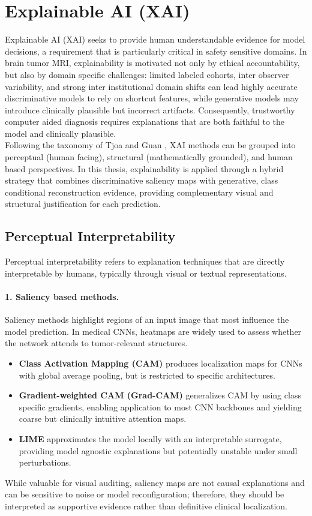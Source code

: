 \section{Explainable AI (XAI)}

Explainable AI (XAI) seeks to provide human understandable evidence for model decisions, a requirement that is particularly critical in safety sensitive domains. In brain tumor MRI, explainability is motivated not only by ethical accountability, but also by domain specific challenges: limited labeled cohorts, inter observer variability, and strong inter institutional domain shifts can lead highly accurate discriminative models to rely on shortcut features, while generative models may introduce clinically plausible but incorrect artifacts. Consequently, trustworthy computer aided diagnosis requires explanations that are both faithful to the model and clinically plausible.\\

Following the taxonomy of Tjoa and Guan \cite{9233366}, XAI methods can be grouped into perceptual (human facing), structural (mathematically grounded), and human based perspectives. In this thesis, explainability is applied through a hybrid strategy that combines discriminative saliency maps with generative, class conditional reconstruction evidence, providing complementary visual and structural justification for each prediction.

\subsection{Perceptual Interpretability}

Perceptual interpretability refers to explanation techniques that are directly interpretable by humans, typically through visual or textual representations.

\paragraph{1. Saliency based methods.}
Saliency methods highlight regions of an input image that most influence the model prediction. In medical CNNs, heatmaps are widely used to assess whether the network attends to tumor-relevant structures.
\begin{itemize}
    \item \textbf{Class Activation Mapping (CAM)} produces localization maps for CNNs with global average pooling, but is restricted to specific architectures.
    \item \textbf{Gradient-weighted CAM (Grad-CAM)} generalizes CAM by using class specific gradients, enabling application to most CNN backbones and yielding coarse but clinically intuitive attention maps.
    \item \textbf{LIME} approximates the model locally with an interpretable surrogate, providing model agnostic explanations but potentially unstable under small perturbations.
\end{itemize}
While valuable for visual auditing, saliency maps are not causal explanations and can be sensitive to noise or model reconfiguration; therefore, they should be interpreted as supportive evidence rather than definitive clinical localization.

